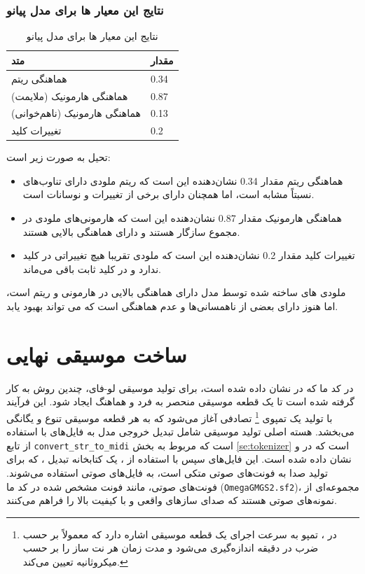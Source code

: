 \subsubsection{نتایج این معیار ها برای مدل پیانو}
\begin{table}
      \centering
      \caption{نتایج این معیار ها برای مدل پیانو}
      \label{resultPi}
      \begin{tabular}{|l|l|}
            \hline
            متد                          & مقدار \\ \hline
            هماهنگی ریتم                 & 0.34  \\ \hline
            هماهنگی هارمونیک (ملایمت)    & 0.87  \\ \hline
            هماهنگی هارمونیک (نا‌هم‌خوانی) & 0.13  \\ \hline
            تغییرات کلید                 & 0.2   \\ \hline
      \end{tabular}
\end{table}
تحیل   به صورت زیر است:
\begin{itemize}
      \item{هماهنگی ریتم} مقدار 0.34 نشان‌دهنده این است که ریتم ملودی دارای تناوب‌های نسبتاً مشابه است، اما همچنان دارای برخی از تغییرات و نوسانات است.
      \item{هماهنگی هارمونیک} مقدار 0.87 نشان‌دهنده این است که هارمونی‌های ملودی در مجموع سازگار هستند و دارای هماهنگی بالایی هستند.
      \item{تغییرات کلید} مقدار 0.2 نشان‌دهنده این است که ملودی تقریبا هیچ تغییراتی در کلید ندارد و در کلید ثابت باقی می‌ماند.
\end{itemize}

ملودی های ساخته شده توسط مدل دارای هماهنگی بالایی در هارمونی و ریتم است، اما هنوز دارای بعضی از ناهمسانی‌ها و عدم هماهنگی است که می تواند بهبود یابد.

\section{ساخت موسیقی نهایی}\label{finalMusic}
در کد ما که در  نشان داده شده است، برای تولید موسیقی لو-فای، چندین روش به کار گرفته شده است
تا یک قطعه موسیقی منحصر به فرد و هماهنگ ایجاد شود. این فرآیند با تولید
یک تمپوی \footnote{در ، تمپو به سرعت اجرای یک قطعه موسیقی اشاره دارد که معمولاً بر حسب ضرب در دقیقه  اندازه‌گیری می‌شود و مدت زمان هر نت ساز را بر حسب میکروثانیه تعیین می‌کند.} تصادفی آغاز می‌شود که به هر قطعه موسیقی تنوع و یگانگی می‌بخشد.
هسته اصلی تولید موسیقی شامل تبدیل خروجی مدل به فایل‌های  با استفاده
از تابع \texttt{convert\_str\_to\_midi} است که مربوط به بخش \ref{se:tokenizer} است که در  و  نشان داده شده است. این فایل‌های  سپس با
استفاده از ، یک کتابخانه تبدیل ، که برای تولید صدا به
فونت‌های صوتی متکی است، به فایل‌های صوتی استفاده می‌شوند. فونت‌های صوتی، مانند
فونت مشخص شده در کد ما
(\texttt{OmegaGMGS2.sf2})، مجموعه‌ای از
نمونه‌های صوتی هستند که صدای سازهای واقعی و با کیفیت بالا را فراهم
می‌کنند.

